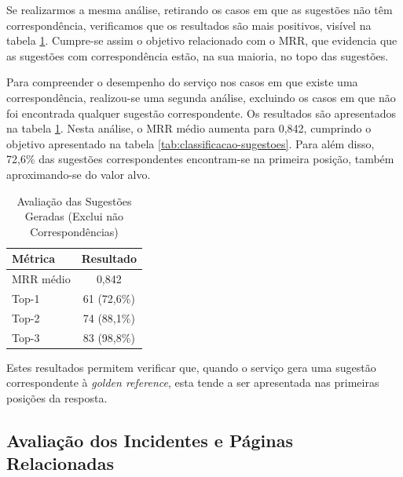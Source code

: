 		Se realizarmos a mesma análise, retirando os casos em que as sugestões não têm correspondência, verificamos que os resultados são mais positivos, visível na tabela \ref{tab:avaliacao-sugestoes_sem_correspondencia}. Cumpre-se assim o objetivo relacionado com o \gls{MRR}, que evidencia que as sugestões com correspondência estão, na sua maioria, no topo das sugestões.
		
		Para compreender o desempenho do serviço nos casos em que existe uma correspondência, realizou-se uma segunda análise, excluindo os casos em que não foi encontrada qualquer sugestão correspondente. Os resultados são apresentados na tabela \ref{tab:avaliacao-sugestoes_sem_correspondencia}. Nesta análise, o \gls{MRR} médio aumenta para 0,842, cumprindo o objetivo apresentado na tabela \ref{tab:classificacao-sugestoes}. Para além disso, 72,6\% das sugestões correspondentes encontram-se na primeira posição, também aproximando-se do valor alvo.
		
		\begin{table}[H]
			\centering
			\small
			\begin{tabular}{lc}
				\hline
				\textbf{Métrica} & \textbf{Resultado} \\
				\hline
				\gls{MRR} médio & 0,842 \\
				\hline
				Top-1 & 61 (72,6\%) \\
				\hline
				Top-2 & 74 (88,1\%) \\
				\hline
				Top-3 & 83 (98,8\%) \\
				\hline
			\end{tabular}
			\caption[Avaliação das Sugestões Geradas (Exclui não Correspondências)]{Avaliação das Sugestões Geradas (Exclui não Correspondências)}
			\label{tab:avaliacao-sugestoes_sem_correspondencia}
		\end{table}
		
		Estes resultados permitem verificar que, quando o serviço gera uma sugestão correspondente à \textit{golden reference}, esta tende a ser apresentada nas primeiras posições da resposta.
	
	\subsection{Avaliação dos Incidentes e Páginas Relacionadas}
		
		
